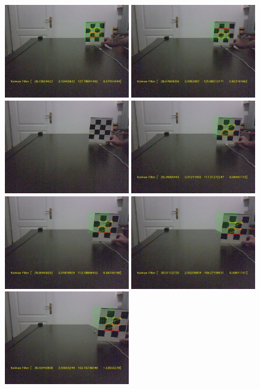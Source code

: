 \documentclass[12pt,fleqn]{article}\usepackage{../common}
\begin{document}
\includegraphics[height=4cm]{cb-kf-5.jpg}
\includegraphics[height=4cm]{cb-kf-6.jpg}
\includegraphics[height=4cm]{cb-kf-7.jpg}
\includegraphics[height=4cm]{cb-kf-8.jpg}
\includegraphics[height=4cm]{cb-kf-9.jpg}
\includegraphics[height=4cm]{cb-kf-10.jpg}
\includegraphics[height=4cm]{cb-kf-11.jpg}
\end{document}
